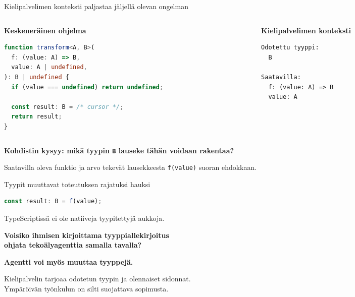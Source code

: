 \documentclass[10pt,aspectratio=169]{beamer}
\newcommand{\accentline}[1]{{\color{DeckAccent}\bfseries #1}}
\newcommand{\muted}[1]{{\color{DeckMuted}#1}}
\newcommand{\danger}[1]{{\color{DeckRed}\bfseries #1}}
\newcommand{\blueline}[1]{{\color{DeckBlue}\bfseries #1}}
\begin{document}
\begin{frame}[fragile]{Kielipalvelimen konteksti paljastaa jäljellä olevan ongelman}
  \begin{columns}[T,onlytextwidth]
    \begin{column}{0.57\textwidth}
      \accentline{Keskeneräinen ohjelma}
\begin{lstlisting}[style=deckcode,language=TypeScript,basicstyle=\ttfamily\footnotesize\color{DeckText}]
function transform<A, B>(
  f: (value: A) => B,
  value: A | undefined,
): B | undefined {
  if (value === undefined) return undefined;

  const result: B = /* cursor */;
  return result;
}
\end{lstlisting}
    \end{column}
    \begin{column}{0.38\textwidth}
      \blueline{Kielipalvelimen konteksti}
\begin{lstlisting}[style=deckcode,basicstyle=\ttfamily\footnotesize\color{DeckText}]
Odotettu tyyppi:
  B

Saatavilla:
  f: (value: A) => B
  value: A
\end{lstlisting}
    \end{column}
  \end{columns}
  \vfill
  {\color{DeckAccent}\large\bfseries Kohdistin kysyy: mikä tyypin \texttt{B} lauseke tähän voidaan rakentaa?}\par
  \muted{Saatavilla oleva funktio ja arvo tekevät lausekkeesta \texttt{f(value)} suoran ehdokkaan.}
\end{frame}

\begin{frame}[fragile]{Tyypit muuttavat toteutuksen rajatuksi hauksi}
\begin{lstlisting}[style=deckcode,language=TypeScript]
const result: B = f(value);
\end{lstlisting}
  {\scriptsize\muted{TypeScriptissä ei ole natiiveja tyypitettyjä aukkoja.}}\par
  \vspace{3mm}
  {\color{DeckAccent}\fontsize{20}{23}\selectfont\bfseries
  Voisiko ihmisen kirjoittama tyyppiallekirjoitus\\ohjata tekoälyagenttia samalla tavalla?}\par
  \vfill
  \danger{Agentti voi myös muuttaa tyyppejä.}\par
  \vspace{2mm}
  \muted{Kielipalvelin tarjoaa odotetun tyypin ja olennaiset sidonnat.\\
  Ympäröivän työnkulun on silti suojattava sopimusta.}
\end{frame}
\end{document}
